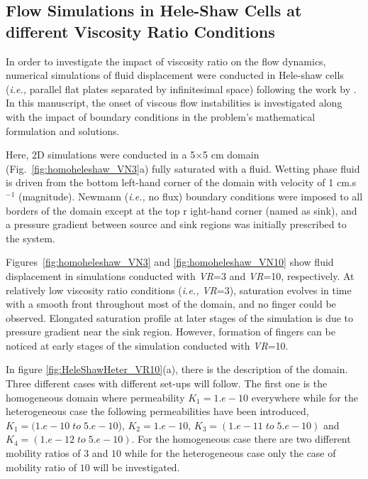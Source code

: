 \documentclass[preprint,authoryear,12pt]{elsarticle}
\newcommand{\ie}{{\it i.e., }}
\begin{document}
\subsection{Flow Simulations in Hele-Shaw Cells at different Viscosity Ratio Conditions}\label{section:results_homo_hete} 
 
In order to investigate the impact of viscosity ratio on the flow dynamics, numerical simulations of fluid displacement were conducted in Hele-shaw cells (\ie parallel flat plates separated by infinitesimal space) following the work by \citet{saffman_1986}. In this manuscript, the onset of viscous flow instabilities \citep[following his seminal work in][]{saffman_1958} is investigated along with the impact of boundary conditions in the problem's mathematical formulation and solutions.

\medskip 
Here, 2D simulations were conducted in a 5$\times$5 cm domain (Fig.~\ref{fig:homoheleshaw_VN3}a) fully saturated with a fluid. Wetting phase fluid is driven from the bottom left-hand corner of the domain with velocity of 1 cm.s$^{-1}$ (magnitude). Newmann (\ie no flux) boundary conditions were imposed to all borders of the domain except at the top r ight-hand corner (named as sink), and a pressure gradient between source and sink regions was initially prescribed to the system. 

\medskip
Figures~\ref{fig:homoheleshaw_VN3} and \ref{fig:homoheleshaw_VN10} show fluid displacement in simulations conducted with {\it VR}=3 and {\it VR}=10, respectively. At relatively low viscosity ratio conditions (\ie {\it VR}=3), saturation evolves in time with a smooth front throughout most of the domain, and no finger could be observed. Elongated saturation profile at later stages of the simulation is due to pressure gradient near the sink region. However, formation of fingers can be noticed at early stages of the simulation conducted with {\it VR}=10.

\medskip
In figure \ref{fig:HeleShawHeter_VR10}(a), there is the description of the domain. Three different cases with different set-ups will follow. The first one is the homogeneous domain where permeability $K_{1}=1.e-10$ everywhere while for the heterogeneous case the following permeabilities have been introduced, $K_{1}=(1.e-10 \;to\; 5.e-10$), $K_{2}=1.e-10$, $K_{3}=(1.e-11 \;to\; 5.e-10)$ and $K_{4}=(1.e-12 \;to\; 5.e-10)$. For the homogeneous case there are  two different mobility ratios of $3$ and $10$ while for the heterogeneous case only the case of  mobility ratio of $10$ will be investigated. 
\end{document}
